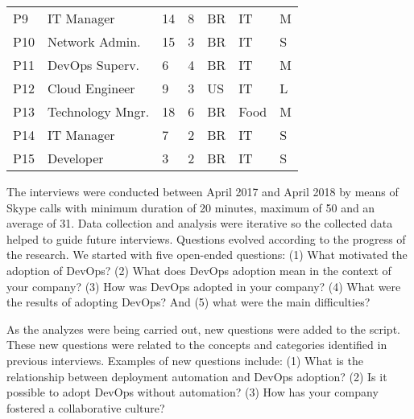 \begin{table}[t]
\begin{tabular}{p{0.4cm}p{2.6cm}p{0.4cm}p{0.45cm}p{0.5cm}p{1.3cm}p{0.3cm}}
P9                   & IT Manager            & 14           & 8           & BR            & IT                 & M                               \\ \centering

P10                  & Network Admin.        & 15           & 3           & BR            & IT                 & S                               \\ \centering

P11                  & DevOps Superv.                & 6            & 4           & BR            & IT                  & M                               \\ \centering

P12                  & Cloud Engineer              & 9            & 3           & US            & IT                  & L                               \\ \centering

P13                  & Technology Mngr.                 & 18            & 6           & BR            & Food                  & M                               \\ \centering

P14                  & IT Manager            & 7            & 2           & BR            & IT                  & S                               \\ \centering

P15                  & Developer        & 3            & 2           & BR            & IT                  & S \\ \bottomrule
\end{tabular}
\end{table}



The interviews were conducted between April 2017 and April 2018 by means of Skype calls
with minimum duration of 20 minutes, maximum of 50 and an average of 31.
Data collection and analysis were iterative so the collected data helped to guide
future interviews. Questions evolved according to
the progress of the research. We started with five open-ended questions: (1) What
motivated the adoption of DevOps? (2) What does DevOps adoption mean in the context of
your company? (3) How was DevOps adopted in your company? (4) What were the
results of adopting DevOps? And (5) what were the main difficulties?

As the analyzes were being carried out, new questions were added to the script.
These new questions were related to the concepts and categories identified in
previous interviews. Examples of new questions include: (1) What is the
relationship between deployment automation and DevOps adoption? (2) Is it
possible to adopt DevOps without automation? (3) How has your company fostered a
collaborative culture?

